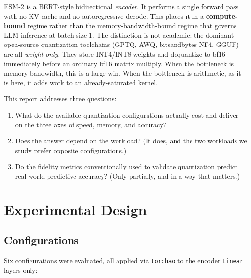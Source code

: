 \documentclass[11pt]{article}
\begin{document}
ESM-2 is a BERT-style bidirectional \emph{encoder}. It performs a single forward
pass with no KV cache and no autoregressive decode. This places it in a
\textbf{compute-bound} regime rather than the memory-bandwidth-bound regime that
governs LLM inference at batch size 1. The distinction is not academic: the
dominant open-source quantization toolchains (GPTQ, AWQ, bitsandbytes NF4, GGUF)
are all \emph{weight-only}. They store INT4/INT8 weights and dequantize to bf16
immediately before an ordinary bf16 matrix multiply. When the bottleneck is
memory bandwidth, this is a large win. When the bottleneck is arithmetic, as it
is here, it adds work to an already-saturated kernel.

This report addresses three questions:

\begin{enumerate}
  \item What do the available quantization configurations actually cost and
        deliver on the three axes of speed, memory, and accuracy?
  \item Does the answer depend on the workload? (It does, and the two workloads
        we study prefer opposite configurations.)
  \item Do the fidelity metrics conventionally used to validate quantization
        predict real-world predictive accuracy? (Only partially, and in a way
        that matters.)
\end{enumerate}

\section{Experimental Design}

\subsection{Configurations}

Six configurations were evaluated, all applied via \texttt{torchao} to the
encoder \texttt{Linear} layers only:
\end{document}
